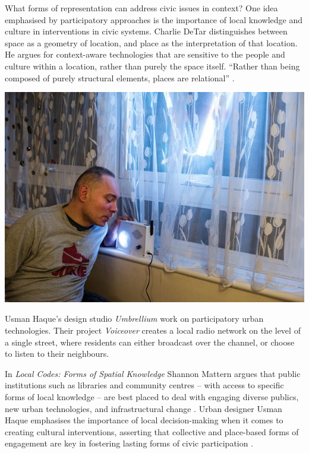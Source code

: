 \documentclass[nofonts,nols,justified,nobib]{tufte-book}
\begin{document}
What forms of representation can address civic issues in context? One idea emphasised by participatory approaches is the importance of local knowledge and culture in interventions in civic systems. Charlie DeTar distinguishes between space as a geometry of location, and place as the interpretation of that location. He argues for context-aware technologies that are sensitive to the people and culture within a location, rather than purely the space itself. ``Rather than being composed of purely structural elements, places are relational'' \cite{detar_mapping_2011}.


\begin{marginfigure}
\includegraphics[width=\textwidth]{img/1/voiceover-finsbury.jpg}
\caption{Usman Haque's design studio \emph{Umbrellium} work on participatory urban technologies. Their project \emph{Voiceover} creates a local radio network on the level of a single street, where residents can either broadcast over the channel, or choose to listen to their neighbours. \cite{umbrellium_voiceover_2016}}
\end{marginfigure}


In \emph{Local Codes: Forms of Spatial Knowledge} Shannon Mattern argues that public institutions such as libraries and community centres -- with access to specific forms of local knowledge -- are best placed to deal with engaging diverse publics, new urban technologies, and infrastructural change \cite{mattern_local_2019}. Urban designer Usman Haque emphasises the importance of local decision-making when it comes to creating cultural interventions, asserting that collective and place-based forms of engagement are key in fostering lasting forms of civic participation \cite{haque_citizen_2017, haque_notes_2008}. 
\end{document}
